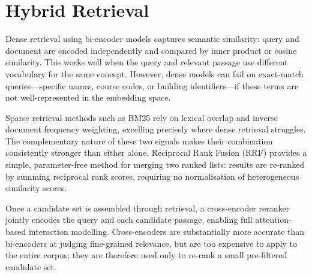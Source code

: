 \section{Hybrid Retrieval}

Dense retrieval using bi-encoder models captures semantic similarity: query and document are encoded independently and compared by inner product or cosine similarity. This works well when the query and relevant passage use different vocabulary for the same concept. However, dense models can fail on exact-match queries---specific names, course codes, or building identifiers---if these terms are not well-represented in the embedding space.

Sparse retrieval methods such as BM25 \parencite{bm25Robertson2009} rely on lexical overlap and inverse document frequency weighting, excelling precisely where dense retrieval struggles. The complementary nature of these two signals makes their combination consistently stronger than either alone. Reciprocal Rank Fusion (RRF) \parencite{rrf2009} provides a simple, parameter-free method for merging two ranked lists: results are re-ranked by summing reciprocal rank scores, requiring no normalisation of heterogeneous similarity scores.

Once a candidate set is assembled through retrieval, a cross-encoder reranker \parencite{sentencetransformers2019} jointly encodes the query and each candidate passage, enabling full attention-based interaction modelling. Cross-encoders are substantially more accurate than bi-encoders at judging fine-grained relevance, but are too expensive to apply to the entire corpus; they are therefore used only to re-rank a small pre-filtered candidate set.
